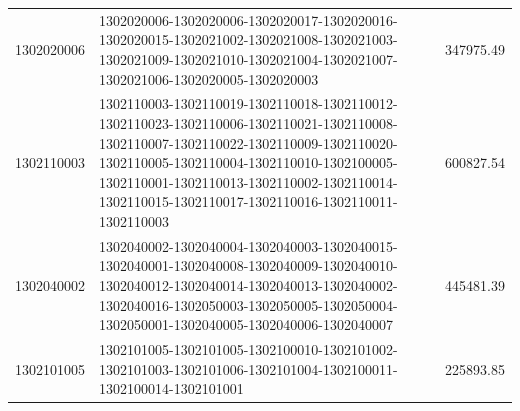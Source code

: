 \begin{longtable}[h]{lp{8cm}r}
		1302020006 & 1302020006-1302020006-1302020017-1302020016-1302020015-1302021002-1302021008-1302021003-1302021009-1302021010-1302021004-1302021007-1302021006-1302020005-1302020003 & 347975.49 \\
		1302110003 & 1302110003-1302110019-1302110018-1302110012-1302110023-1302110006-1302110021-1302110008-1302110007-1302110022-1302110009-1302110020-1302110005-1302110004-1302110010-1302100005-1302110001-1302110013-1302110002-1302110014-1302110015-1302110017-1302110016-1302110011-1302110003 & 600827.54 \\
		1302040002 & 1302040002-1302040004-1302040003-1302040015-1302040001-1302040008-1302040009-1302040010-1302040012-1302040014-1302040013-1302040002-1302040016-1302050003-1302050005-1302050004-1302050001-1302040005-1302040006-1302040007 & 445481.39 \\
		1302101005 & 1302101005-1302101005-1302100010-1302101002-1302101003-1302101006-1302101004-1302100011-1302100014-1302101001 & 225893.85 \\
\end{longtable}


